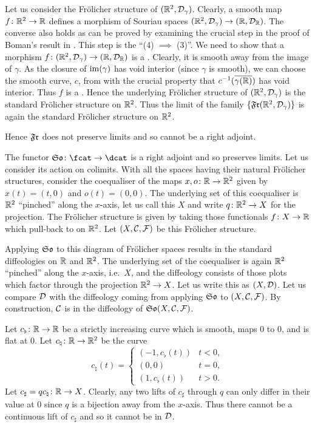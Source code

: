 \documentclass[%
12pt,%
arxiv,%
defaults
]{myclass}
\begin{document}
Let us consider the Fr\"olicher structure of \((\mathbb{R}^2, \mathcal{D}_\gamma)\).
Clearly, a smooth map \(f \colon \mathbb{R}^2 \to \mathbb{R}\)
defines a morphism of Souriau spaces
 \((\mathbb{R}^2, \mathcal{D}_\gamma) \to (\mathbb{R}, \mathcal{D}_{\mathbb{R}})\).
The converse also holds as can be proved by examining the crucial step in the proof of Boman's result in \cite[3.4]{akpm}.
This step is the ``(4) \(\implies\) (3)''.
We need to show that a morphism
 \(f \colon (\mathbb{R}^2, \mathcal{D}_\gamma) \to (\mathbb{R}, \mathcal{D}_{\mathbb{R}})\)
is a \cimap.
Clearly, it is smooth away from the image of \(\gamma\).
As the closure of \(\operatorname{im}(\gamma)\) has void interior (since \(\gamma\) is smooth), we can choose the smooth curve, \(c\), from \cite[3.4]{akpm} with the crucial property that
 \(c^{-1}(\overline{\gamma(\mathbb{R})})\)
has void interior.
Thus \(f\) is a \cimap.
Hence the underlying Fr\"olicher structure of \((\mathbb{R}^2, \mathcal{D}_\gamma)\)
is the standard Fr\"olicher structure on \(\mathbb{R}^2\).
Thus the limit of the family
 \(\{\SoFr(\R^2, \m{D}_\gamma)\}\)
is again the standard Fr\"olicher structure on \(\mathbb{R}^2\).

Hence \(\SoFr\) does not preserve limits and so cannot be a right adjoint.

\medskip

The functor
 \(\FrSo \colon \fcat \to \dcat\)
is a right adjoint and so preserves limits.
Let us consider its action on colimits.
With all the spaces having their natural Fr\"olicher structures, consider the coequaliser of the maps
 \(x, o \colon \mathbb{R} \to \mathbb{R}^2\)
given by \(x(t) = (t,0)\) and \(o(t) = (0,0)\).
The underlying set of this coequaliser is \(\mathbb{R}^2\) ``pinched'' along the \(x\)\hyp{}axis, let us call this \(X\) and write \(q \colon \mathbb{R}^2 \to X\) for the projection.
The Fr\"olicher structure is given by taking those functionals \(f \colon X \to \mathbb{R}\) which pull\hyp{}back to \cimaps on \(\mathbb{R}^2\).
Let \((X, \mathcal{C}, \mathcal{F})\) be this Fr\"olicher structure.

Applying \(\FrSo\) to this diagram of Fr\"olicher spaces results in the standard diffeologies on \(\mathbb{R}\) and \(\mathbb{R}^2\).
The underlying set of the coequaliser is again \(\mathbb{R}^2\) ``pinched'' along the \(x\)\hyp{}axis, i.e.~\(X\), and the diffeology consists of those plots which factor through the projection \(\mathbb{R}^2 \to X\).
Let us write this as \((X, \mathcal{D})\).
Let us compare \(\mathcal{D}\) with the diffeology coming from applying \(\FrSo\) to \((X, \mathcal{C}, \mathcal{F})\).
By construction, \(\mathcal{C}\) is in the diffeology of \(\FrSo(X, \m{C}, \m{F})\).

Let
 \(c_\flat \colon \mathbb{R} \to \mathbb{R}\)
be a strictly increasing curve which is smooth, maps \(0\) to \(0\), and is flat at \(0\).
Let
 \(c_\natural \colon \mathbb{R} \to \mathbb{R}^2\)
be the curve
%
\[
 c_\natural(t) = \begin{cases} (-1, c_\flat(t)) &
  t < 0, \\
  (0,0) & t = 0, \\
  (1, c_\flat(t)) & t > 0.
 \end{cases}
\]
%
Let
 \(c_\sharp = q c_\natural \colon \mathbb{R} \to X\).
Clearly, any two lifts of \(c_\sharp\) through \(q\) can only differ in their value at \(0\) since \(q\) is a bijection away from the \(x\)\hyp{}axis.
Thus there cannot be a continuous lift of \(c_\sharp\) and so it cannot be in \(\mathcal{D}\).
\end{document}
